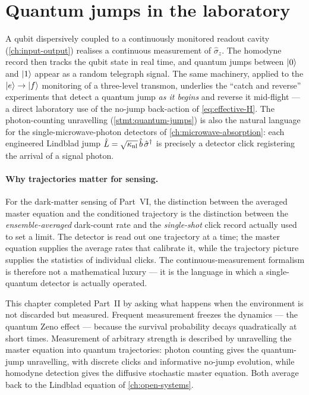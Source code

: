 \section{Quantum jumps in the laboratory}
\label{sec:jumps-lab}

\begin{example}
\label{ex:telegraph}
A qubit dispersively coupled to a continuously monitored readout
cavity (\cref{ch:input-output}) realises a continuous measurement
of $\hat\sigma_z$. The homodyne record then tracks the qubit state
in real time, and quantum jumps between $\ket0$ and $\ket1$ appear
as a random telegraph signal. The same machinery, applied to the
$\ket{e}\to\ket{f}$ monitoring of a three-level transmon, underlies
the ``catch and reverse'' experiments that detect a quantum jump
\emph{as it begins} and reverse it mid-flight --- a direct
laboratory use of the no-jump back-action of
\cref{eq:effective-H}. The photon-counting unravelling
(\cref{stmt:quantum-jumps}) is also the natural language for the
single-microwave-photon detectors of \cref{ch:microwave-absorption}:
each engineered Lindblad jump $\hat{L}=\sqrt{\kappa_{\rm nl}}\,\hat b\,\hat\sigma^\dagger$
is precisely a detector click registering the arrival of a signal
photon.
\end{example}

\paragraph{Why trajectories matter for sensing.}
For the dark-matter sensing of Part~VI, the distinction between the
averaged master equation and the conditioned trajectory is the
distinction between the \emph{ensemble-averaged} dark-count rate and
the \emph{single-shot} click record actually used to set a limit.
The detector is read out one trajectory at a time; the master
equation supplies the average rates that calibrate it, while the
trajectory picture supplies the statistics of individual clicks.
The continuous-measurement formalism is therefore not a
mathematical luxury --- it is the language in which a
single-quantum detector is actually operated.

This chapter completed Part~II by asking what happens when the
environment is not discarded but measured. Frequent measurement
freezes the dynamics --- the quantum Zeno effect --- because the
survival probability decays quadratically at short times.
Measurement of arbitrary strength is described by unravelling the
master equation into quantum trajectories: photon counting gives
the quantum-jump unravelling, with discrete clicks and informative
no-jump evolution, while homodyne detection gives the diffusive
stochastic master equation. Both average back to the Lindblad
equation of \cref{ch:open-systems}.

